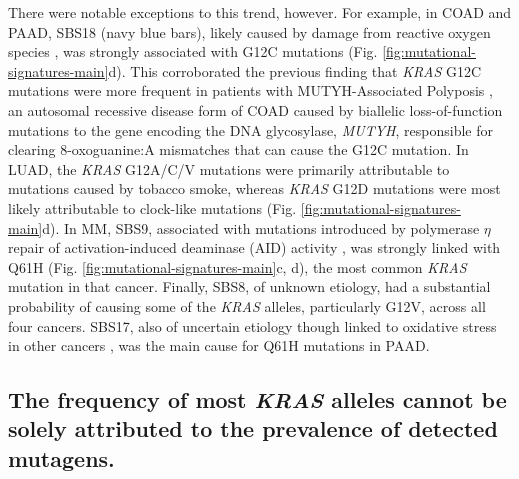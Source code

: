 \documentclass[english, 10pt, letterpaper]{article}
\newcommand{\KRAS}{\emph{KRAS}}
\begin{document}
There were notable exceptions to this trend, however.
For example, in COAD and PAAD, SBS18 (navy blue bars), likely caused by damage from reactive oxygen species \cite{Viel2017, Pilati2017}, was strongly associated with G12C mutations (Fig. \ref{fig:mutational-signatures-main}d).
This corroborated the previous finding that \KRAS{} G12C mutations were more frequent in patients with MUTYH-Associated Polyposis \cite{Viel2017}, an autosomal recessive disease form of COAD caused by biallelic loss-of-function mutations to the gene encoding the DNA glycosylase, \emph{MUTYH}, responsible for clearing 8-oxoguanine:A mismatches that can cause the G12C mutation.
In LUAD, the \KRAS{} G12A/C/V mutations were primarily attributable to mutations caused by tobacco smoke, whereas \KRAS{} G12D mutations were most likely attributable to clock-like mutations (Fig. \ref{fig:mutational-signatures-main}d).
In MM, SBS9, associated with mutations introduced by polymerase $\eta$ repair of activation-induced deaminase (AID) activity \cite{Alexandrov2013, Rogozin2018DNACancer., Petljak2016UnderstandingCancer.}, was strongly linked with Q61H (Fig. \ref{fig:mutational-signatures-main}c, d), the most common \KRAS{} mutation in that cancer.
Finally, SBS8, of unknown etiology, had a substantial probability of causing some of the \KRAS{} alleles, particularly G12V, across all four cancers.
SBS17, also of uncertain etiology though linked to oxidative stress in other cancers \cite{Tomkova2018MutationalAsymmetry}, was the main cause for Q61H mutations in PAAD.


\subsection*{The frequency of most \KRAS{} alleles cannot be solely attributed to the prevalence of detected mutagens.}
\end{document}
